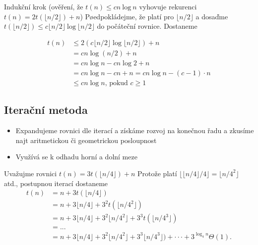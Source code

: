 \documentclass{szzclass}
\begin{document}
Indukční krok
(ověření, že $t(n) \leq cn~\text{log}~n$ vyhovuje rekurenci $t(n) = 2t(\lfloor n/2 \rfloor) + n$)
Pøedpokládejme, že platí pro $\lfloor n/2 \rfloor$ a dosaďme
$t(\lfloor n/2 \rfloor) \leq c \lfloor n/2 \rfloor~\text{log}~ \lfloor n/2 \rfloor$ do počáteční rovnice. Dostaneme



\begin{align*}
t(n) &\leq 2(c \lfloor n/2 \rfloor \log{\lfloor n/2 \rfloor}) + n\\
     &= cn \log{(n/2)} + n\\
     &= cn \log{ n} - cn \log{} 2 + n\\
     &= cn \log{ n} - cn + n = cn \log{ n} - (c - 1)\cdot n\\
     &\leq cn\log{n}\text{, pokud }c \geq 1
\end{align*}



\subsection{Iterační metoda}

\begin{itemize}
    \item Expandujeme rovnici dle iterací a získáme rozvoj na konečnou řadu a zkusíme najt aritmetickou či geometrickou posloupnost
    \item Využívá se k odhadu horní a dolní meze
\end{itemize}

Uvažujme rovnici
$t(n) = 3t(\lfloor n/4\rfloor) + n$
Protože platí $\lfloor \lfloor n/4\rfloor /4\rfloor = \lfloor n/4^2 \rfloor$
atd., postupnou iterací dostaneme
\begin{align*}
t(n) &= n + 3t(\lfloor n/4 \rfloor)\\
     &= n + 3 \lfloor n/4\rfloor + 3^2t(\lfloor n/4^2 \rfloor)\\
     &= n + 3 \lfloor n/4 \rfloor + 3^2\lfloor n/4^2 \rfloor + 3^3t(\lfloor n/4^3 \rfloor)\\
     &= . . .\\
     &= n + 3 \lfloor n/4\rfloor + 3^2 \lfloor n/4^2 \rfloor + 3^3 \lfloor n/4^3 \rfloor) + · · · + 3^{\log_4 n} \Theta(1).
\end{align*}
\end{document}
